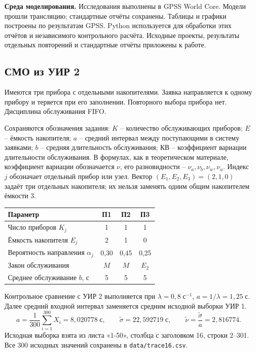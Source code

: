\documentclass[12pt,a4paper]{article}
\begin{document}
\noindent\textbf{Среда моделирования.} Исследования выполнены в GPSS World Core. Модели прошли трансляцию; стандартные отчёты сохранены. Таблицы и графики построены по результатам GPSS. Python используется для обработки этих отчётов и независимого контрольного расчёта. Исходные проекты, результаты отдельных повторений и стандартные отчёты приложены к работе.

\subsection{СМО из УИР 2}
Имеются три прибора с отдельными накопителями. Заявка направляется к одному прибору и теряется при его заполнении. Повторного выбора прибора нет. Дисциплина обслуживания FIFO.

Сохраняются обозначения задания: \(K\) -- количество обслуживающих приборов; \(E\) -- ёмкость накопителя; \(a\) -- средний интервал между поступающими в систему заявками; \(b\) -- средняя длительность обслуживания; КВ -- коэффициент вариации длительности обслуживания. В формулах, как в теоретическом материале, коэффициент вариации обозначается \(\nu\), его разновидности -- \(\nu_a,\nu_b,\nu_w,\nu_u\). Индекс \(j\) обозначает отдельный прибор или узел. Вектор \((E_1,E_2,E_3)=(2,1,0)\) задаёт три отдельных накопителя; их нельзя заменять одним общим накопителем ёмкости 3.

\begin{center}\small\renewcommand{\arraystretch}{1.3}
\begin{tabular}{|l|c|c|c|}\hline
Параметр & П1 & П2 & П3\\\hline
Число приборов \(K_j\) & 1 & 1 & 1\\\hline
Ёмкость накопителя \(E_j\) & 2 & 1 & 0\\\hline
Вероятность направления \(\alpha_j\) & 0,30 & 0,45 & 0,25\\\hline
Закон обслуживания & \(M\) & \(M\) & \(E_2\)\\\hline
Среднее обслуживание \(b\), с & 5 & 5 & 5\\\hline
\end{tabular}\end{center}


Контрольное сравнение с УИР 2 выполняется при \(\lambda=0{,}8\;\text{с}^{-1}\), \(a=1/\lambda=1{,}25\;\text{с}\). Далее средний входной интервал заменяется средним исходной выборки УИР 1.
\begin{equation}
a=\frac1{300}\sum_{i=1}^{300}X_i=8{,}020778\;\text{с},\qquad
\widetilde\sigma=22{,}592719\;\text{с},\qquad
\widetilde\nu=\frac{\widetilde\sigma}{a}=2{,}816774.
\end{equation}
Исходная выборка взята из листа «1-50», столбца с заголовком 16, строки 2--301. Все 300 исходных значений сохранены в \texttt{data/trace16.csv}.
\end{document}
